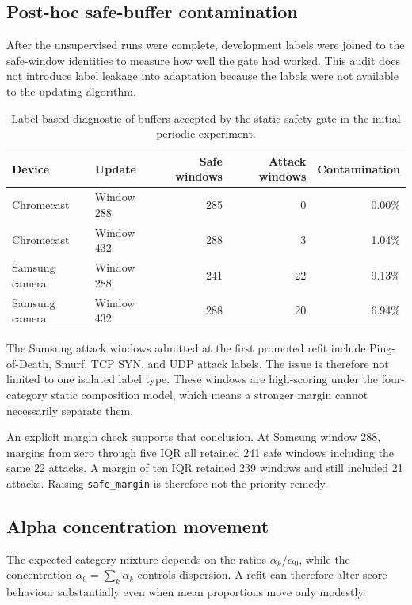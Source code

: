 \documentclass[11pt,a4paper]{article}
\begin{document}
\subsection{Post-hoc safe-buffer contamination}

After the unsupervised runs were complete, development labels were joined to
the safe-window identities to measure how well the gate had worked. This audit
does not introduce label leakage into adaptation because the labels were not
available to the updating algorithm.

\begin{table}[ht]
\centering
\small
\begin{tabular}{llrrr}
\toprule
\textbf{Device} & \textbf{Update} & \textbf{Safe windows} &
\textbf{Attack windows} & \textbf{Contamination} \\
\midrule
Chromecast & Window 288 & 285 & 0 & 0.00\% \\
Chromecast & Window 432 & 288 & 3 & 1.04\% \\
Samsung camera & Window 288 & 241 & 22 & 9.13\% \\
Samsung camera & Window 432 & 288 & 20 & 6.94\% \\
\bottomrule
\end{tabular}
\caption{Label-based diagnostic of buffers accepted by the static safety gate
in the initial periodic experiment.}
\label{tab:contamination}
\end{table}

The Samsung attack windows admitted at the first promoted refit include
Ping-of-Death, Smurf, TCP SYN, and UDP attack labels. The issue is therefore not
limited to one isolated label type. These windows are high-scoring under the
four-category static composition model, which means a stronger margin cannot
necessarily separate them.

An explicit margin check supports that conclusion. At Samsung window 288,
margins from zero through five IQR all retained 241 safe windows including the
same 22 attacks. A margin of ten IQR retained 239 windows and still included 21
attacks. Raising \texttt{safe\_margin} is therefore not the priority remedy.

\subsection{Alpha concentration movement}

The expected category mixture depends on the ratios
$\alpha_k/\alpha_0$, while the concentration
$\alpha_0=\sum_k\alpha_k$ controls dispersion. A refit can therefore alter
score behaviour substantially even when mean proportions move only modestly.
\end{document}
